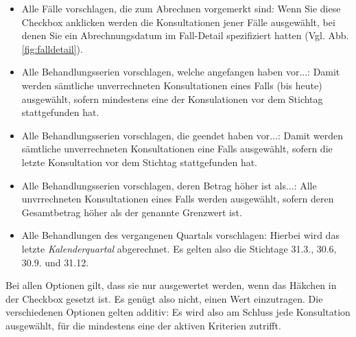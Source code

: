 \begin{itemize}
\item Alle Fälle vorschlagen, die zum Abrechnen vorgemerkt sind: Wenn Sie diese Checkbox anklicken werden die Konsultationen jener Fälle ausgewählt, bei denen Sie ein Abrechnungsdatum im Fall-Detail spezifiziert hatten (Vgl. Abb. \ref{fig:falldetail}).
\item Alle Behandlungsserien vorschlagen, welche angefangen haben vor...: Damit werden sämtliche unverrechneten Konsultationen eines Falls (bis heute) ausgewählt, sofern mindestens eine der Konsulationen vor dem Stichtag stattgefunden hat.
\item Alle Behandlungsserien vorschlagen, die geendet haben vor...: Damit werden sämtliche unverrechneten Konsultationen eine Falls ausgewählt, sofern die letzte Konsultation vor dem Stichtag stattgefunden hat.
\item Alle Behandlungsserien vorschlagen, deren Betrag höher ist als...: Alle unvrrechneten Konsultationen eines Falls werden ausgewählt, sofern deren Gesamtbetrag höher als der genannte Grenzwert ist.
\item Alle Behandlungen des vergangenen Quartals vorschlagen: Hierbei wird das letzte \textit{Kalenderquartal} abgerechnet. Es gelten also die Stichtage 31.3., 30.6, 30.9. und 31.12.
\end{itemize}
Bei allen Optionen gilt, dass sie nur ausgewertet werden, wenn das Häkchen in der Checkbox gesetzt ist. Es genügt also nicht, einen Wert einzutragen. Die verschiedenen Optionen gelten additiv: Es wird also am Schluss jede Konsultation ausgewählt, für die mindestens eine der aktiven Kriterien zutrifft.

\medskip

\clearpage

